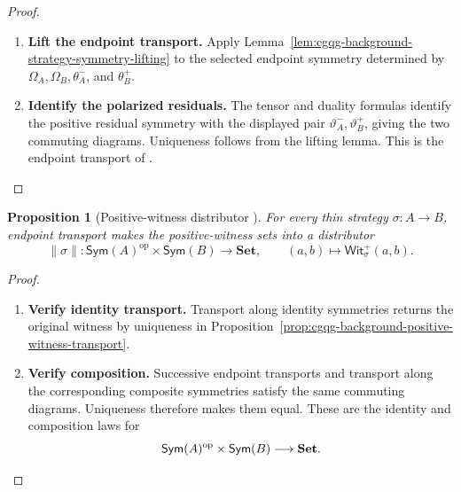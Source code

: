 \documentclass[oneside]{article}
\newcommand{\Sym}{\mathsf{Sym}}
\newcommand{\Wit}{\mathsf{Wit}}
\newcommand{\op}{\mathrm{op}}
\theoremstyle{plain}
\newtheorem{proposition}[theorem]{Proposition}
\theoremstyle{definition}
\theoremstyle{remark}
\begin{document}
\begin{proof}
    \leavevmode
    \begin{enumerate}[beginpenalty=10000]
        \item \textbf{Lift the endpoint transport.} Apply Lemma~\ref{lem:cgqg-background-strategy-symmetry-lifting} to the selected endpoint symmetry determined by \(\Omega_A,\Omega_B,\theta_A^-\), and \(\theta_B^+\).

        \item \textbf{Identify the polarized residuals.} The tensor and duality formulas identify the positive residual symmetry with the displayed pair \(\vartheta_A^-,\vartheta_B^+\), giving the two commuting diagrams. Uniqueness follows from the lifting lemma. This is the endpoint transport of \cite[Proposition~5.6]{ClairambaultOlimpieriPaquet2025}. \qedhere
    \end{enumerate}
\end{proof}

\begin{proposition}[Positive-witness distributor {\cite[Proposition~5.7]{ClairambaultOlimpieriPaquet2025}}]
\label{prop:cgqg-background-positive-witness-distributor}
    For every thin strategy \(\sigma:A\to B\), endpoint transport makes the positive-witness sets into a distributor
    \begin{equation}
        \lVert\sigma\rVert:
        \Sym(A)^\op\times\Sym(B)
        \longrightarrow\mathbf{Set},
        \qquad
        (a,b)\longmapsto\Wit_\sigma^+(a,b).
    \label{eq:cgqg-positive-witness-distributor}
    \end{equation}
\end{proposition}
\begin{proof}
    \leavevmode
    \begin{enumerate}[beginpenalty=10000]
        \item \textbf{Verify identity transport.} Transport along identity symmetries returns the original witness by uniqueness in Proposition~\ref{prop:cgqg-background-positive-witness-transport}.

        \item \textbf{Verify composition.} Successive endpoint transports and transport along the corresponding composite symmetries satisfy the same commuting diagrams. Uniqueness therefore makes them equal. These are the identity and composition laws for
        \[
            \Sym(A)^\op\times\Sym(B)\longrightarrow\mathbf{Set}.\qedhere
        \]
    \end{enumerate}
\end{proof}
\end{document}
